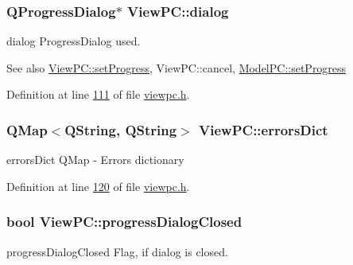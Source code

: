 \subsubsection[{\texorpdfstring{dialog}{dialog}}]{\setlength{\rightskip}{0pt plus 5cm}Q\+Progress\+Dialog$\ast$ View\+P\+C\+::dialog}\hypertarget{class_view_p_c_a31abbb470fe329b44e6ffee202b903ca}{}\label{class_view_p_c_a31abbb470fe329b44e6ffee202b903ca}


dialog Progress\+Dialog used. 

\begin{DoxySeeAlso}{See also}
\hyperlink{class_view_p_c_a9c32a1fdb6ead84e5ada8fba8860c7ed}{View\+P\+C\+::set\+Progress}, View\+P\+C\+::cancel, \hyperlink{class_model_p_c_afdcd80f0ed5062e145a71f09b0897547}{Model\+P\+C\+::set\+Progress} 
\end{DoxySeeAlso}


Definition at line \hyperlink{viewpc_8h_source_l00111}{111} of file \hyperlink{viewpc_8h_source}{viewpc.\+h}.

\subsubsection[{\texorpdfstring{errors\+Dict}{errorsDict}}]{\setlength{\rightskip}{0pt plus 5cm}Q\+Map$<$Q\+String, Q\+String$>$ View\+P\+C\+::errors\+Dict}\hypertarget{class_view_p_c_aaf7f058e5589d65fec72a21abfd5629b}{}\label{class_view_p_c_aaf7f058e5589d65fec72a21abfd5629b}


errors\+Dict Q\+Map -\/ Errors dictionary 



Definition at line \hyperlink{viewpc_8h_source_l00120}{120} of file \hyperlink{viewpc_8h_source}{viewpc.\+h}.

\subsubsection[{\texorpdfstring{progress\+Dialog\+Closed}{progressDialogClosed}}]{\setlength{\rightskip}{0pt plus 5cm}bool View\+P\+C\+::progress\+Dialog\+Closed}\hypertarget{class_view_p_c_add8c82aa2b0b934212aa5bde9277ab36}{}\label{class_view_p_c_add8c82aa2b0b934212aa5bde9277ab36}


progress\+Dialog\+Closed Flag, if dialog is closed. 


